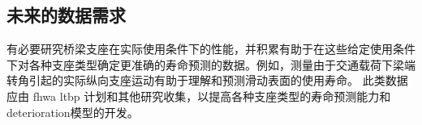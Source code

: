 \subsection{未来的数据需求}
有必要研究桥梁支座在实际使用条件下的性能，并积累有助于在这些给定使用条件下对各种支座类型确定更准确的寿命预测的数据。例如，测量由于交通载荷下梁端转角引起的实际纵向支座运动有助于理解和预测滑动表面的{使用寿命}。 此类数据应由 \acrshort*{fhwa} \acrshort*{ltbp} 计划和其他研究收集，以提高各种支座类型的寿命预测能力和\gls*{deterioration}模型的开发。